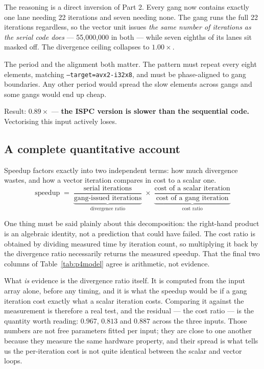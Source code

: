 \documentclass[11pt,a4paper]{article}
\begin{document}
The reasoning is a direct inversion of Part 2. Every gang now contains exactly
one lane needing 22 iterations and seven needing none. The gang runs the full
22 iterations regardless, so the vector unit issues \emph{the same number of
iterations as the serial code does} --- 55{,}000{,}000 in both --- while seven
eighths of its lanes sit masked off. The divergence ceiling collapses to
$1.00\times$.

The period and the alignment both matter. The pattern must repeat every eight
elements, matching \texttt{--target=avx2-i32x8}, and must be phase-aligned to
gang boundaries. Any other period would spread the slow elements across gangs
and some gangs would end up cheap.

Result: $\mathbf{0.89\times}$ --- \textbf{the ISPC version is slower than the
sequential code.} Vectorising this input actively loses.

\subsection{A complete quantitative account}

Speedup factors exactly into two independent terms: how much divergence wastes,
and how a vector iteration compares in cost to a scalar one.
\[
\text{speedup} \;=\;
\underbrace{\frac{\text{serial iterations}}{\text{gang-issued iterations}}}_{\text{divergence ratio}}
\;\times\;
\underbrace{\frac{\text{cost of a scalar iteration}}{\text{cost of a gang iteration}}}_{\text{cost ratio}}
\]

\begin{table}[H]
\centering
\small
\progFourModel
\caption{The divergence ratio is computed from the input data alone; the cost
         ratio is derived by dividing measured time by iteration count. Their
         product is therefore an identity that returns the measured speedup;
         the divergence ratio alone is the part known in advance.}
\label{tab:p4model}
\end{table}

One thing must be said plainly about this decomposition: the right-hand
product is an algebraic identity, not a prediction that could have failed. The
cost ratio is obtained by dividing measured time by iteration count, so
multiplying it back by the divergence ratio necessarily returns the measured
speedup. That the final two columns of Table~\ref{tab:p4model} agree is
arithmetic, not evidence.

What \emph{is} evidence is the divergence ratio itself. It is computed from
the input array alone, before any timing, and it is what the speedup would be
if a gang iteration cost exactly what a scalar iteration costs. Comparing it
against the measurement is therefore a real test, and the residual --- the cost
ratio --- is the quantity worth reading: $0.967$, $0.813$ and $0.887$ across
the three inputs. Those numbers are not free parameters fitted per input; they
are close to one another because they measure the same hardware property, and
their spread is what tells us the per-iteration cost is not quite identical
between the scalar and vector loops.
\end{document}
